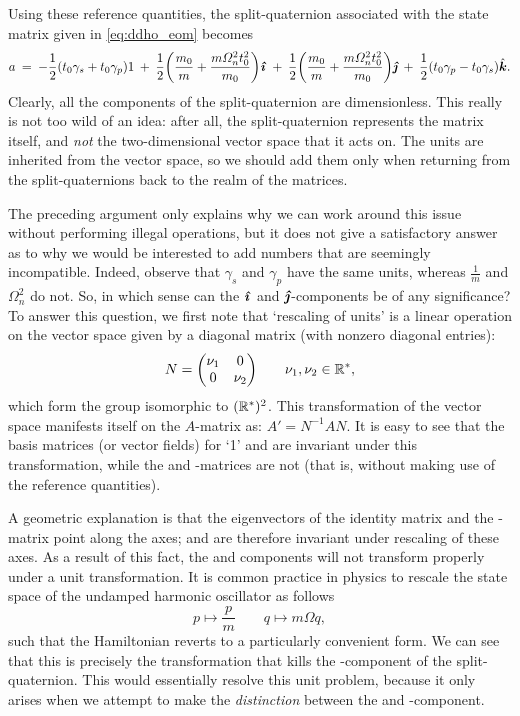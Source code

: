 Using these reference quantities, the split-quaternion associated with the state matrix given in \cref{eq:ddho_eom} becomes
\begin{equation}
    a\:=\: -\frac{1}{2}\qty(t_0\gamma_s + t_0\gamma_p)1\:+\:\frac{1}{2}\qty(\frac{m_0}{m} + \frac{m\Omega_n^2 t_0^2}{m_0})\quati\:+\:\frac{1}{2}\qty(\frac{m_0}{m} + \frac{m\Omega_n^2 t_0^2}{m_0})\quatj\:+\:\frac{1}{2}\qty(t_0\gamma_p - t_0\gamma_s)\quatk. 
    \label{eq:ddho_quat_units}
\end{equation}
Clearly, all the components of the split-quaternion are dimensionless. This really is not too wild of an idea: after all, the split-quaternion represents the matrix itself, and \emph{not} the two-dimensional vector space that it acts on. The units are inherited from the vector space, so we should add them only when returning from the split-quaternions back to the realm of the matrices. 

The preceding argument only explains why we can work around this issue without performing illegal operations, but it does not give a satisfactory answer as to why we would be interested to add numbers that are seemingly incompatible. Indeed, observe that \(\gamma_s\) and \(\gamma_p\) have the same units, whereas \(\tfrac{1}{m}\) and \(\Omega_n^2\) do not. So, in which sense can the \(\quati\) and \(\quatj\)-components be of any significance? To answer this question, we first note that `rescaling of units' is a linear operation on the vector space given by a diagonal matrix (with nonzero diagonal entries): 
\begin{equation}
     N = \mqty(\dmat[0]{\nu_1}{\nu_2}) \qquad \nu_1, \nu_2 \in \real^*,
\end{equation}
which form the group isomorphic to \((\real^*)^2\). This transformation of the vector space manifests itself on the \(A\)-matrix as: \( A' = N^{-1}A N\). It is easy to see that the basis matrices (or vector fields) for `1' and \quatk are invariant under this transformation, while the \quati and \quatj-matrices are not (that is, without making use of the reference quantities). 

A geometric explanation is that the eigenvectors of the identity matrix and the \quatk-matrix point along the axes; and are therefore invariant under rescaling of these axes. As a result of this fact, the \quati and \quatj components will not transform properly under a unit transformation. It is common practice in physics to rescale the state space of the undamped harmonic oscillator as follows \cite{Dekker1981,Dedene1980}
\begin{equation}
     p \mapsto \frac{p}{m} \qquad q \mapsto m\Omega q,
\end{equation}
such that the Hamiltonian reverts to a particularly convenient form. We can see that this is precisely the transformation that kills the \quatj-component of the split-quaternion. This would essentially resolve this unit problem, because it only arises when we attempt to make the \emph{distinction} between the \quati and \quatj-component.

